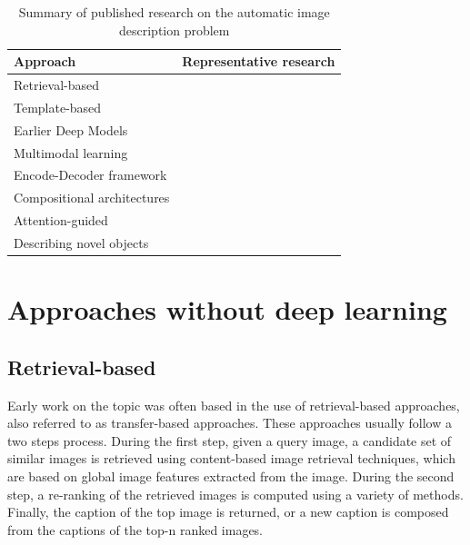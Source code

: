 \begin{table}[hpt]
    \caption{Summary of published research on the automatic image description problem}
    \label{tab:classification}
    \begin{tabular}{p{40mm}|p{120mm}}
        Approach & Representative research \\
        \hline
        Retrieval-based & \citet{Farhadi2010, Ordonez2011, Gupta2012, Kuznetsova2012, Hodosh2013a, Kuznetsova2014, Mason2015, Hodosh2013b}\\
        Template-based &  \citet{Yang2011, Kulkarni2011, Li2011, Mitchell2012, Ushiku2015}\\
        Earlier Deep Models &  \citet{Socher2014, Karpathy2014, Ma2015, Yan2015, Lebret2015a, Yagcioglu2015}\\
        Multimodal learning & \citet{Kiros2014a, Mao2015a, Karpathy2015, Chen2015}\\
        Encode-Decoder framework & \citet{Kiros2014b, Vinyals2015, Donahue2015, Jia2015, Wu2015, Pu2016b}\\ 
        Compositional architectures & \citet{Fang2015, Tran2016, Ma2016, Oruganti2016, Wang2016, Jin2015}\\
        Attention-guided & \citet{Xu2015, You2016, Yang2016, Zhou2017, Cao2019, He2019}\\
        Describing novel objects & \citet{Mao2015b, Hendricks2016} 
    \end{tabular}
\end{table}

\section{Approaches without deep learning}

\subsection{Retrieval-based}

Early work on the topic was often based in the use of retrieval-based approaches, also referred to as transfer-based approaches. These approaches usually follow a two steps process. During the first step, given a query image, a candidate set of similar images is retrieved using content-based image retrieval techniques, which are based on global image features extracted from the image. During the second step, a re-ranking of the retrieved images is computed using a variety of methods. Finally, the caption of the top image is returned, or a new caption is composed from the captions of the top-n ranked images.

